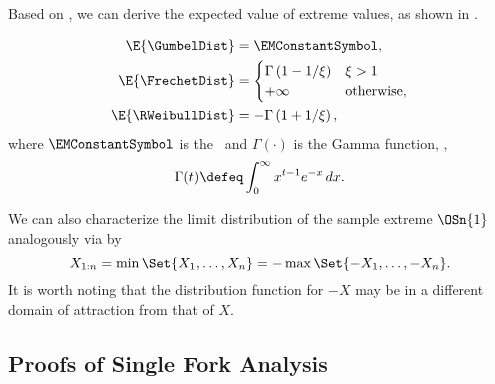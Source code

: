 Based on , we can derive the expected value of extreme values, as shown in
.
\begin{lem}
    \label{lem:E_evt_dists}
    \begin{align*}
        \E{\GumbelDist} &= \EMConstantSymbol,
        \\
        \E{\FrechetDist} &= \begin{cases}
            \Gamma\left( 1 - 1/\xi \right)
            & \xi > 1 \\
            +\infty & \mathrm{otherwise},
        \end{cases} \\
        \E{\RWeibullDist} &= -\Gamma\left( 1 + 1/\xi \right),
    \end{align*}
    where $\EMConstantSymbol$ is the \EulerConstant\ and 
    $\Gamma(\cdot)$ is the Gamma function, \ie,
    \begin{equation*}
        \Gamma(t) \defeq \int_0^{\infty} x^{t-1} e^{-x} \, dx
        .
    \end{equation*}
\end{lem}

We can also characterize the limit distribution of the sample extreme $\OSn{1}$
analogously via  by 
\begin{equation*}
    X_{1:n} = \min\Set{X_1, \ldots, X_n} = - \max\Set{-X_1, \ldots, -X_n}.
\end{equation*}
It is worth noting that the distribution function for $-X$ may be in a different
domain of attraction from that of $X$.



\subsection{Proofs of Single Fork Analysis}
\label{sec:proof_single_fork_general}




